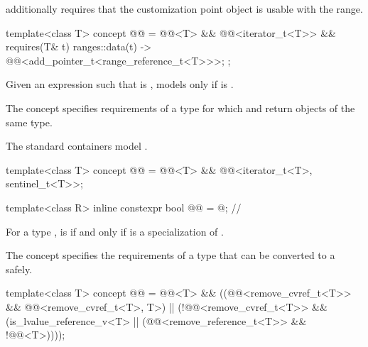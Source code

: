 \pnum
{} additionally requires that
the  customization point object
is usable with the range.

\begin{itemdecl}
template<class T>
  concept @@ =
    @@<T> && @@<iterator_t<T>> &&
    requires(T& t) {
      { ranges::data(t) } -> @@<add_pointer_t<range_reference_t<T>>>;
    };
\end{itemdecl}

\pnum
Given an expression  such that  is ,
 models  only if
is .

\pnum
The  concept specifies requirements of
a  type for which  and
 return objects of the same type.
\begin{example}
The standard containers model .
\end{example}

\begin{itemdecl}
template<class T>
  concept @@ =
    @@<T> && @@<iterator_t<T>, sentinel_t<T>>;
\end{itemdecl}

\begin{itemdecl}
template<class R>
  inline constexpr bool @@ = @\seebelow@;        // \expos
\end{itemdecl}

\begin{itemdescr}
\pnum
For a type ,
 is  if and only if
 is a specialization of .
\end{itemdescr}

\pnum
The  concept specifies the requirements of a
 type that can be converted to a  safely.

\begin{itemdecl}
template<class T>
  concept @@ =
    @@<T> &&
    ((@@<remove_cvref_t<T>> && @@<remove_cvref_t<T>, T>) ||
     (!@@<remove_cvref_t<T>> &&
      (is_lvalue_reference_v<T> || (@@<remove_reference_t<T>> && !@@<T>))));
\end{itemdecl}

